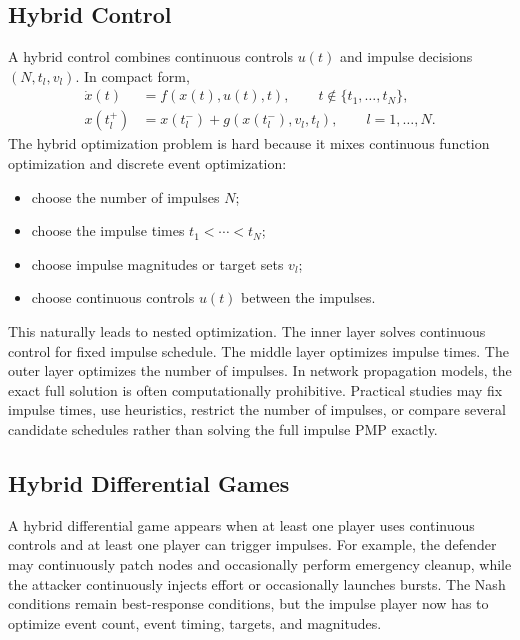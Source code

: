 \documentclass[11pt,a4paper]{article}
\begin{document}
\subsection{Hybrid Control}

A hybrid control combines continuous controls $u(t)$ and impulse decisions $(N,t_l,v_l)$. In compact form,
\begin{align}
  \dot{x}(t)&=f(x(t),u(t),t),\qquad t\notin\{t_1,\dots,t_N\},\label{eq:hybrid-flow}\\
  x(t_l^+)&=x(t_l^-)+g(x(t_l^-),v_l,t_l),\qquad l=1,\dots,N.\label{eq:hybrid-jump}
\end{align}
The hybrid optimization problem is hard because it mixes continuous function optimization and discrete event optimization:
\begin{itemize}
  \item choose the number of impulses $N$;
  \item choose the impulse times $t_1<\cdots<t_N$;
  \item choose impulse magnitudes or target sets $v_l$;
  \item choose continuous controls $u(t)$ between the impulses.
\end{itemize}
This naturally leads to nested optimization. The inner layer solves continuous control for fixed impulse schedule. The middle layer optimizes impulse times. The outer layer optimizes the number of impulses. In network propagation models, the exact full solution is often computationally prohibitive. Practical studies may fix impulse times, use heuristics, restrict the number of impulses, or compare several candidate schedules rather than solving the full impulse PMP exactly.

\subsection{Hybrid Differential Games}

A hybrid differential game appears when at least one player uses continuous controls and at least one player can trigger impulses. For example, the defender may continuously patch nodes and occasionally perform emergency cleanup, while the attacker continuously injects effort or occasionally launches bursts. The Nash conditions remain best-response conditions, but the impulse player now has to optimize event count, event timing, targets, and magnitudes.
\end{document}
